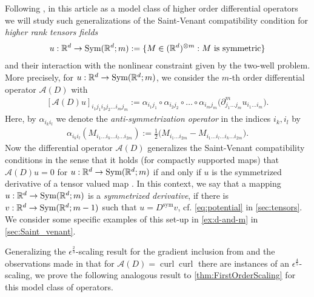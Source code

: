 \documentclass[a4paper, 10pt, twoside, notitlepage]{amsart}
\theoremstyle{plain}
\newcommand{\R}{\mathbb{R}}
\newcommand{\p}{\partial}
\newcommand{\A}{\mathcal{A}}
\renewcommand{\S}[1]{\textup{Sym}(\R^d;#1)}
\newcommand{\Ds}{D^{\text{sym}}}
\DeclareMathOperator{\curl}{curl}
\begin{document}
	Following \cite[Chapter 2]{Sha94}, in
	this article as a model class of higher order differential operators we will study such generalizations of the Saint-Venant compatibility condition for \emph{higher rank tensors fields}
	\begin{align*}
		u : \R^d \to \S{m}:=\{M \in (\R^d)^{\otimes m}: M \mbox{ is symmetric}\}
	\end{align*}
	and their interaction with the nonlinear constraint given by the two-well problem.
	More precisely, for $u : \R^d \to \S{m}$, we consider the $m$-th order differential operator $\A(D)$ with
	\begin{align}
		\label{eq:compat_op}
		[\A(D)u]_{i_1 j_1 i_2 j_2 \dots i_m j_m} := \alpha_{i_1 j_1} \circ \alpha_{i_2 j_2} \circ \dots \circ \alpha_{i_m j_m} \Big( \p_{j_1 \dots j_m}^m u_{i_1 \dots i_m} \Big).
	\end{align}
	Here, by $\alpha_{i_k i_l}$ we denote the \emph{anti-symmetrization operator} in the indices $i_k, i_l$ by
	\begin{align*}
		\alpha_{i_k i_l}(M_{i_1 \dots i_k \dots i_l \dots i_{2m}}) := \frac{1}{2} \Big( M_{i_1 \dots i_{2m}} - M_{i_1 \dots i_l \dots i_k \dots i_{2m}} \Big).
	\end{align*}
        Now the differential operator $\mathcal{A}(D)$ generalizes the Saint-Venant compatibility conditions in the sense that it holds (for compactly supported maps) that $\A(D)u = 0$ for
	$u: \R^d \to \S{m}$ if and only if $u$ is the symmetrized derivative of a tensor valued map \cite[Theorem 2.2.1]{Sha94}. In this context, we say that a mapping $u: \R^d \to \S{m}$ is a
	\emph{symmetrized derivative}, if there is $v: \R^d \to \S{m-1}$ such that $u = \Ds v$, cf. \cref{eq:potential} in \cref{sec:tensors}.
	We consider some specific examples of this set-up in \cref{ex:d-and-m} in \cref{sec:Saint_venant}.
	
	
      Generalizing the $\epsilon^{\frac{2}{3}}$-scaling result for the gradient inclusion from \cite{KM92,KM94} and the observations made in \cite{CC15} that for $\A(D) = \curl \curl$ there are instances of an $\epsilon^{\frac{4}{5}}$- scaling, we prove the following analogous result to \cref{thm:FirstOrderScaling} for this model class of operators.
        
\end{document}
